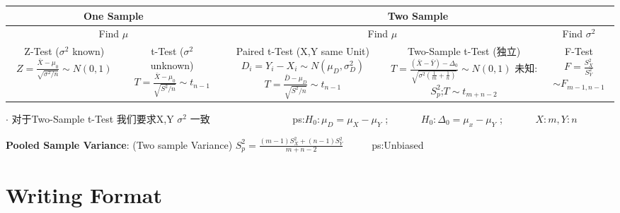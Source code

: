 \documentclass[9pt]{article}
\begin{document}
\vspace{-0.4cm}
\begin{longtable}{|c|c|c|c|c|}
    \hline
    \multicolumn{2}{|c|}{One Sample} & \multicolumn{3}{c|}{Two Sample}                   \\
    \hline
    \multicolumn{2}{|c|}{Find $\mu$} & \multicolumn{2}{c|}{Find $\mu$} & Find $\sigma^2$ \\
    \hline
    \makecell{Z-Test ($\sigma^2$ known)                                                  \\ $Z=\frac{\bar{X}-\mu_0}{\sqrt{\sigma^2/n}}\sim N(0,1)$} & \makecell{t-Test ($\sigma^2$ unknown) \\ $T=\frac{\bar{X}-\mu_0}{\sqrt{S^2/n}}\sim t_{n-1}$} & \makecell{Paired t-Test (X,Y same Unit) \\ $D_i=Y_i-X_i\sim N(\mu_D,\sigma^2_D)$ \\ $T=\frac{\bar{D}-\mu_D}{\sqrt{S^2/n}}\sim t_{n-1}$} & \makecell{Two-Sample t-Test (独立) \\ $T=\frac{(\bar{X}-\bar{Y})-\Delta_0}{\sqrt{\sigma^2(\frac{1}{m}+\frac{1}{n})}}\sim N(0,1)$ \\ {\fontsize{10}{12}\selectfont 未知:}$S^2_p$;$T\sim t_{m+n-2}$} & \makecell{F-Test \\ $F=\frac{S^2_X}{S^2_Y}$ \\ $\sim F_{m-1,n-1}$} \\
    \hline
\end{longtable}
\vspace{-0.4cm}

$\cdot$ 对于Two-Sample t-Test 我们要求X,Y $\sigma^2$ 一致 \ \ \ \ \ \ \ \ \ \ \ \ \ \ \ \  ps:$H_0:\mu_D=\mu_X-\mu_Y$ ; \ \ \ \ \ \  $H_0:\Delta_0=\mu_x-\mu_Y$ ; \ \ \ \ \ \ $X:m,Y:n$

\textbf{Pooled Sample Variance}: (Two sample Variance) $S^2_p=\frac{(m-1)S^2_X+(n-1)S^2_Y}{m+n-2}$ \ \ \ \ \ ps:Unbiased


\section{Writing Format}

\scriptsize
\setlength{\parindent}{0pt}
\end{document}
